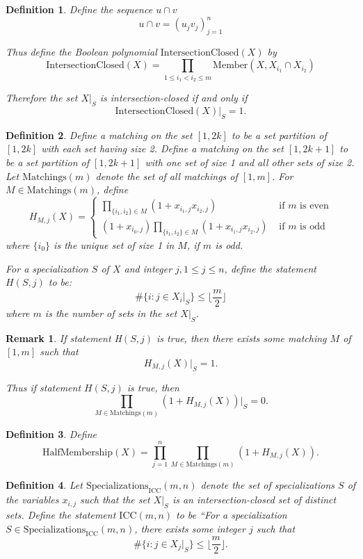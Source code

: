 \documentclass[11pt, oneside]{article}   	%
\newtheorem{definition}{Definition}
\newtheorem{remark}{Remark}
\begin{document}
\begin{definition} 

Define the sequence $u \cap v$ 
$$
u \cap v= (u_jv_j)_{j=1}^n
$$

Thus define the Boolean polynomial $\mathrm{IntersectionClosed}(X)$ by 
$$
\mathrm{IntersectionClosed}(X) = \prod_{1 \leq i_1<i_2 \leq m}\mathrm{Member}(X,X_{i_1} \cap X_{i_2}) 
$$

Therefore the set $X|_S$ is intersection-closed if and only if 
$$
\mathrm{IntersectionClosed}(X)|_S = 1.
$$
\end{definition} 

\begin{definition} 
Define a matching on the set $[1,2k]$ to be a set partition of $[1,2k]$ with each set having size 2. Define a matching on the set $[1,2k+1]$ to be a set partition of $[1,2k+1]$ with one set of size 1 and all other sets of size 2. Let $\mathrm{Matchings}(m)$ denote the set of all matchings of $[1,m]$. For $M \in  \mathrm{Matchings}(m)$, define
$$
H_{M,j}(X) = \begin{cases} \prod_{\{ i_1,i_2\} \in M} (1+ x_{i_1,j}x_{i_2,j}) &\text{ if $m$ is even} \\ 
(1+x_{i_0, j})\prod_{\{ i_1,i_2\} \in M} (1+ x_{i_1,j}x_{i_2,j}) &\text{ if $m$ is odd} 
\end{cases}
$$
where $\{i_0\}$ is the unique set of size 1 in $M$, if $m$ is odd. 

For a specialization $S$ of $X$ and integer $j, 1 \leq j \leq n$, define the statement $H(S,j)$ to be: 
\[
\#\{ i \colon j \in X_i|_S\} \leq  \lfloor \frac{m}{2}\rfloor
\]
 where $m$ is the number of sets in the set $X|_S$. 
\end{definition}

\begin{remark}If statement H$(S,j)$ is true, then there exists some matching $M$ of $[1,m]$ such that  
$$
H_{M,j}(X)|_S = 1.
$$

Thus if statement $H(S,j)$ is true, then 
$$
\prod_{M \in \mathrm{Matchings}(m)} (1+H_{M,j}(X))|_S=0. 
$$
\end{remark}

\begin{definition} 
Define $$\mathrm{HalfMembership}(X) = \prod_{j=1}^n \prod_{M \in \mathrm{Matchings}(m)} (1+H_{M,j}(X)).$$
\end{definition}

\begin{definition} 
Let $\mathrm{Specializations}_{\mathrm{ICC}}(m,n)$ denote the set of specializations $S$ of the variables $x_{i,j}$ such that the set $X|_S$ is an intersection-closed set of distinct sets. Define the statement $\mathrm{ICC}(m,n)$ to be ``For a specialization $S \in \mathrm{Specializations}_{\mathrm{ICC}}(m,n)$, there exists some integer $j$ such that 
\[
\#\{ i \colon j \in X_j|_S \} \leq \lfloor \frac{m}{2}\rfloor.  
\]
\end{definition}
\end{document}
